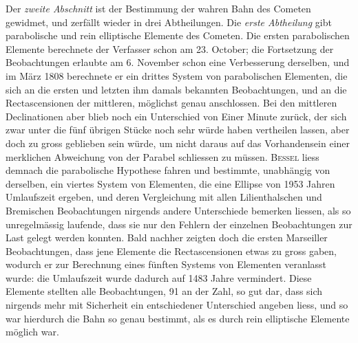 Der \emph{zweite Abschnitt} ist der Bestimmung der wahren Bahn des Cometen gewidmet, und zerfällt wieder in drei Abtheilungen. Die \emph{erste Abtheilung} gibt parabolische und rein elliptische Elemente des Cometen. Die ersten parabolischen Elemente berechnete der Verfasser schon am 23. October; die Fortsetzung der Beobachtungen erlaubte am 6. November schon eine Verbesserung derselben, und im März 1808 berechnete er ein drittes System von parabolischen Elementen, die sich an die ersten und letzten ihm damals bekannten Beobachtungen, und an die Rectascensionen der mittleren, möglichst genau anschlossen. Bei den mittleren Declinationen aber blieb noch ein Unterschied von Einer Minute zurück, der sich zwar unter die fünf übrigen Stücke noch sehr würde haben vertheilen lassen, aber doch zu gross geblieben sein würde, um nicht daraus auf das Vorhandensein einer merklichen Abweichung von der Parabel schliessen zu müssen. \textsc{Bessel} liess demnach die parabolische Hypothese fahren und bestimmte, unabhängig von derselben, ein viertes System von Elementen, die eine Ellipse von 1953 Jahren Umlaufszeit ergeben, und deren Vergleichung mit allen Lilienthalschen und Bremischen Beobachtungen nirgends andere Unterschiede bemerken liessen, als so unregelmässig laufende, dass sie nur den Fehlern der einzelnen Beobachtungen zur Last gelegt werden konnten. Bald nachher zeigten doch die ersten Marseiller Beobachtungen, dass jene Elemente die Rectascensionen etwas zu gross gaben, wodurch er zur Berechnung eines fünften Systems von Elementen veranlasst wurde: die Umlaufszeit wurde dadurch auf 1483 Jahre vermindert. Diese Elemente stellten alle Beobachtungen, 91 an der Zahl, so gut dar, dass sich nirgends mehr mit Sicherheit ein entschiedener Unterschied angeben liess, und so war hierdurch die Bahn so genau bestimmt, als es durch rein elliptische Elemente möglich war.

